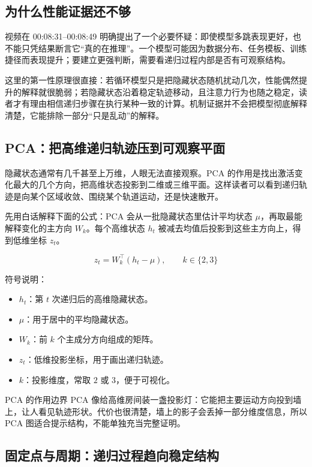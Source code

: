 ﻿\documentclass[a4paper]{article}
\begin{document}
\subsection{为什么性能证据还不够}

视频在 00:08:31--00:08:49 明确提出了一个必要怀疑：即使模型多跳表现更好，也不能只凭结果断言它“真的在推理”。一个模型可能因为数据分布、任务模板、训练捷径而表现提升；要建立更强判断，需要看递归过程内部是否有可观察结构。

这里的第一性原理很直接：若循环模型只是把隐藏状态随机扰动几次，性能偶然提升的解释就很脆弱；若隐藏状态沿着稳定轨迹移动，且注意力行为也随之稳定，读者才有理由相信递归步骤在执行某种一致的计算。机制证据并不会把模型彻底解释清楚，它能排除一部分“只是乱动”的解释。

\subsection{PCA：把高维递归轨迹压到可观察平面}

隐藏状态通常有几千甚至上万维，人眼无法直接观察。PCA 的作用是找出激活变化最大的几个方向，把高维状态投影到二维或三维平面。这样读者可以看到递归轨迹是向某个区域收敛、围绕某个轨道运动，还是快速散开。

先用白话解释下面的公式：PCA 会从一批隐藏状态里估计平均状态 \(\mu\)，再取最能解释变化的主方向 \(W_k\)。每个高维状态 \(h_t\) 被减去均值后投影到这些主方向上，得到低维坐标 \(z_t\)。

\[
z_t=W_k^\top(h_t-\mu),\qquad k\in\{2,3\}
\]

符号说明：
\begin{itemize}
  \item \(h_t\)：第 \(t\) 次递归后的高维隐藏状态。
  \item \(\mu\)：用于居中的平均隐藏状态。
  \item \(W_k\)：前 \(k\) 个主成分方向组成的矩阵。
  \item \(z_t\)：低维投影坐标，用于画出递归轨迹。
  \item \(k\)：投影维度，常取 \(2\) 或 \(3\)，便于可视化。
\end{itemize}

\begin{knowledgebox}{PCA 的作用边界}
PCA 像给高维房间装一盏投影灯：它能把主要运动方向投到墙上，让人看见轨迹形状。代价也很清楚，墙上的影子会丢掉一部分维度信息，所以 PCA 图适合提示结构，不能单独充当完整证明。
\end{knowledgebox}

\subsection{固定点与周期：递归过程趋向稳定结构}
\end{document}
